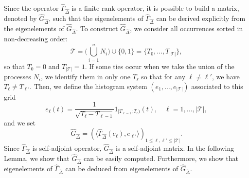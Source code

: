 \documentclass[aos]{imsart}
\theoremstyle{plain}
\theoremstyle{remark}
\newcommand{\1}{1}
\begin{document}
 Since the operator $\widehat\Gamma_{\widehat\Delta}$ is a finite-rank operator, it is possible to build a matrix, denoted by $\widehat G_{\widehat\Delta}$, such that the eigenelements of $\widehat\Gamma_{\widehat\Delta}$ can be derived explicitly from the eigenelements of $\widehat G_{\widehat\Delta}$.  To construct $\widehat G_{\widehat\Delta}$, we consider all occurrences sorted in non-decreasing order:
\[
\mathcal{T} = \Big(\bigcup_{i=1}^n N_i\Big)\cup\{0,1\}=\Big\{T_0,\hdots,T_{|\mathcal{T} |}\Big\}, 
\]
so that $T_0 = 0$ and $T_{|\mathcal{T} |}=1.$ If some ties occur when we take the union of the processes $N_i$, we identify them in only one $T_\ell$ so that for any $\ell\not=\ell'$, we have $T_\ell\not= T_{\ell'}$. Then, we define the histogram system $(e_1, \hdots, e_{|\mathcal{T} |})$  associated to this grid
\[
e_\ell(t)=\frac1{\sqrt{T_{\ell}-T_{\ell-1}}}1_{[T_{\ell-1};T_{\ell})}(t),\quad \ell=1,\hdots,|\mathcal{T} |,
\]
 and we set
 \[
\widehat G_{\widehat\Delta}=\left(\langle \widehat\Gamma_{\widehat\Delta} (e_\ell),e_{\ell'}\rangle\right)_{1\leq \ell,\ell'\leq |\mathcal{T} |}.
\]
Since $ \widehat\Gamma_{\widehat\Delta}$ is self-adjoint operator, $\widehat G_{\widehat\Delta}$ is a self-adjoint matrix. In the following Lemma, we show that $\widehat G_{\widehat\Delta}$ can be easily computed. Furthermore, we show that eigenelements of $ \widehat\Gamma_{\widehat\Delta}$ can be deduced from eigenelements of $ \widehat G_{\widehat\Delta}$.
\end{document}
